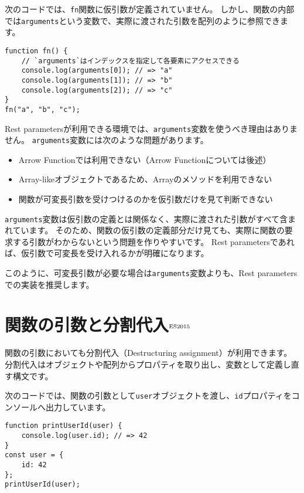 次のコードでは、\texttt{fn}関数に仮引数が定義されていません。
しかし、関数の内部では\texttt{arguments}という変数で、実際に渡された引数を配列のように参照できます。

\begin{lstlisting}
function fn() {
    // `arguments`はインデックスを指定して各要素にアクセスできる
    console.log(arguments[0]); // => "a" 
    console.log(arguments[1]); // => "b" 
    console.log(arguments[2]); // => "c" 
}
fn("a", "b", "c");
\end{lstlisting}

Rest
parametersが利用できる環境では、\texttt{arguments}変数を使うべき理由はありません。
\texttt{arguments}変数には次のような問題があります。

\begin{itemize}
\item
  Arrow Functionでは利用できない（Arrow Functionについては後述）
\item
  Array-likeオブジェクトであるため、Arrayのメソッドを利用できない
\item
  関数が可変長引数を受けつけるのかを仮引数だけを見て判断できない
\end{itemize}

\texttt{arguments}変数は仮引数の定義とは関係なく、実際に渡された引数がすべて含まれています。
そのため、関数の仮引数の定義部分だけ見ても、実際に関数の要求する引数がわからないという問題を作りやすいです。
Rest parametersであれば、仮引数で可変長を受け入れるかが明確になります。

このように、可変長引数が必要な場合は\texttt{arguments}変数よりも、Rest
parametersでの実装を推奨します。

\hypertarget{function-destructuring}{%
\section{関数の引数と分割代入{$^{\rm ES2015}$}}\label{function-destructuring}}

関数の引数においても分割代入（Destructuring assignment）が利用できます。
分割代入はオブジェクトや配列からプロパティを取り出し、変数として定義し直す構文です。

次のコードでは、関数の引数として\texttt{user}オブジェクトを渡し、\texttt{id}プロパティをコンソールへ出力しています。

\begin{lstlisting}
function printUserId(user) {
    console.log(user.id); // => 42
}
const user = {
    id: 42
};
printUserId(user);
\end{lstlisting}

